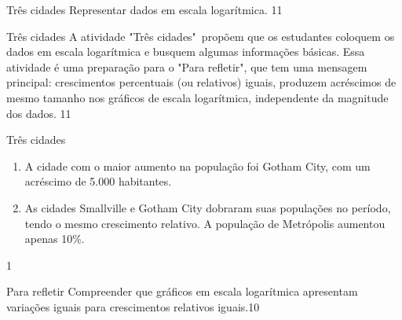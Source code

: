 \clearpage

\def\currentcolor{session4}
\begin{objectives}{Três cidades}
{
	Representar dados em escala logarítmica.
}{1}{1}
\end{objectives}
\begin{sugestions}{Três cidades}
{
	A atividade "Três cidades"\, propõem que os estudantes coloquem os dados em escala logarítmica e busquem algumas informações básicas. Essa atividade é uma preparação para o "Para refletir", que tem uma mensagem principal: crescimentos percentuais (ou relativos) iguais, produzem acréscimos de mesmo tamanho nos gráficos de escala logarítmica, independente da magnitude dos dados.
}{1}{1}
\end{sugestions}
\begin{answer}{Três cidades}
{
	\begin{center}
\end{center}
\begin{enumerate}
\item A cidade com o maior aumento na população  foi Gotham City, com um acréscimo de 5.000 habitantes.
\item As cidades Smallville e Gotham City dobraram suas populações no período, tendo o mesmo crescimento relativo. A população de Metrópolis aumentou apenas 10\%.
\end{enumerate}
}{1}
\end{answer}
\clearmargin
\begin{objectives}{Para refletir}
{Compreender que gráficos em escala logarítmica apresentam variações iguais para crescimentos relativos iguais.}{1}{0}
\end{objectives}
